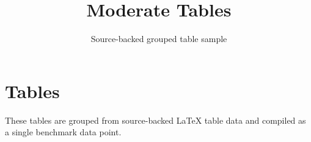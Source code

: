 \documentclass[11pt]{article}
\title{Moderate Tables}
\author{Source-backed grouped table sample}
\date{}
\begin{document}
\maketitle
\section{Tables}
These tables are grouped from source-backed LaTeX table data and compiled as a single benchmark data point.

\begin{table}[htbp]
\centering
\caption{Source table 1: 2512.02677\_table\_2}
\end{table}
\end{document}

